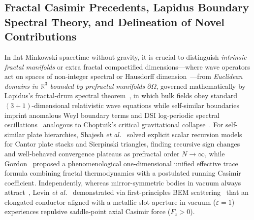 \documentclass[aps,prd,twocolumn,10pt,showkeys,nofootinbib,floatfix,longbibliography]{revtex4-2}
\begin{document}
\subsection{Fractal Casimir Precedents, Lapidus Boundary Spectral Theory, and Delineation of Novel Contributions}
In flat Minkowski spacetime without gravity, it is crucial to distinguish \emph{intrinsic fractal manifolds} or extra fractal compactified dimensions---where wave operators act on spaces of non-integer spectral or Hausdorff dimension~\cite{akkermans2010,calcagni2010,cheng2013ijtp}---from \emph{Euclidean domains in $\mathbb{R}^3$ bounded by prefractal manifolds $\partial\Omega$}, governed mathematically by Lapidus's fractal-drum spectral theorem~\cite{lapidus1991tams}, in which bulk fields obey standard $(3+1)$-dimensional relativistic wave equations while self-similar boundaries imprint anomalous Weyl boundary terms and DSI log-periodic spectral oscillations~\cite{sornette1998} analogous to Choptuik's critical gravitational collapse~\cite{choptuik1993}. For self-similar plate hierarchies, Shajesh \emph{et al.}~\cite{shajesh2016,shajesh2017} solved explicit scalar recursion models for Cantor plate stacks and Sierpinski triangles, finding recursive sign changes and well-behaved convergence plateaus as prefractal order $N \to \infty$, while Gordon~\cite{gordon2026prd} proposed a phenomenological one-dimensional unified effective trace formula combining fractal thermodynamics with a postulated running Casimir coefficient. Independently, whereas mirror-symmetric bodies in vacuum always attract~\cite{kennethklich2006}, Levin \emph{et al.}~\cite{levin2010} demonstrated via first-principles BEM scattering~\cite{reid2009,reid2013,rodriguez2009pra} that an elongated conductor aligned with a metallic slot aperture in vacuum ($\varepsilon = 1$) experiences repulsive saddle-point axial Casimir force ($F_z > 0$).
\end{document}
